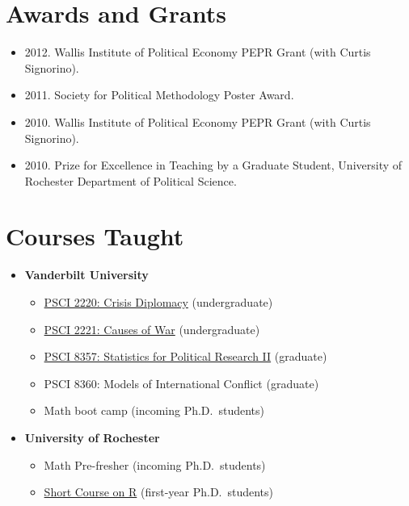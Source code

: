 \documentclass[11pt]{article}
\providecommand{\tightlist}{%
  \setlength{\itemsep}{0pt}\setlength{\parskip}{0pt}}
\begin{document}
\section{Awards and Grants}\label{awards-and-grants}

\begin{itemize}
\item
  2012. Wallis Institute of Political Economy PEPR Grant (with Curtis
  Signorino).
\item
  2011. Society for Political Methodology Poster Award.
\item
  2010. Wallis Institute of Political Economy PEPR Grant (with Curtis
  Signorino).
\item
  2010. Prize for Excellence in Teaching by a Graduate Student,
  University of Rochester Department of Political Science.
\end{itemize}

\section{Courses Taught}\label{courses-taught}

\begin{itemize}
\tightlist
\item
  \textbf{Vanderbilt University}

  \begin{itemize}
  \tightlist
  \item
    \href{http://bkenkel.com/psci2220}{PSCI 2220: Crisis Diplomacy}
    (undergraduate)
  \item
    \href{http://bkenkel.com/psci221}{PSCI 2221: Causes of War}
    (undergraduate)
  \item
    \href{http://bkenkel.com/psci8357}{PSCI 8357: Statistics for
    Political Research II} (graduate)
  \item
    PSCI 8360: Models of International Conflict (graduate)
  \item
    Math boot camp (incoming Ph.D.~students)
  \end{itemize}
\item
  \textbf{University of Rochester}

  \begin{itemize}
  \tightlist
  \item
    Math Pre-fresher (incoming Ph.D.~students)
  \item
    \href{https://github.com/brentonk/rcourse}{Short Course on R}
    (first-year Ph.D.~students)
  \end{itemize}
\end{itemize}
\end{document}
